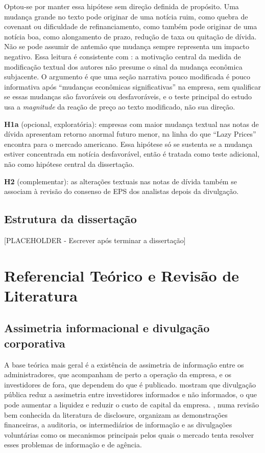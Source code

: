 \documentclass[a4paper,12pt]{report}
\begin{document}
Optou-se por manter essa hipótese sem direção definida de propósito. Uma mudança grande no texto pode originar de uma notícia ruim, como quebra de covenant ou dificuldade de refinanciamento, como também pode originar de uma notícia boa, como alongamento de prazo, redução de taxa ou quitação de dívida. Não se pode assumir de antemão que mudança sempre representa um impacto negativo. Essa leitura é consistente com : a motivação central da medida de modificação textual dos autores não presume o sinal da mudança econômica subjacente. O argumento é que uma seção narrativa pouco modificada é pouco informativa após ``mudanças econômicas significativas'' na empresa, sem qualificar se essas mudanças são favoráveis ou desfavoráveis, e o teste principal do estudo usa a \emph{magnitude} da reação de preço ao texto modificado, não sua direção.

\textbf{H1a} (opcional, exploratória): empresas com maior mudança textual nas notas de dívida apresentam retorno anormal futuro menor, na linha do que ``Lazy Prices'' encontra para o mercado americano. Essa hipótese só se sustenta se a mudança estiver concentrada em notícia desfavorável, então é tratada como teste adicional, não como hipótese central da dissertação.

\textbf{H2} (complementar): as alterações textuais nas notas de dívida também se associam à revisão do consenso de EPS dos analistas depois da divulgação.

\section{Estrutura da dissertação}

[PLACEHOLDER - Escrever após terminar a dissertação]

\chapter{Referencial Teórico e Revisão de Literatura}

\section{Assimetria informacional e divulgação corporativa}

A base teórica mais geral é a existência de assimetria de informação entre os administradores, que acompanham de perto a operação da empresa, e os investidores de fora, que dependem do que é publicado.  mostram que divulgação pública reduz a assimetria entre investidores informados e não informados, o que pode aumentar a liquidez e reduzir o custo de capital da empresa. , numa revisão bem conhecida da literatura de disclosure, organizam as demonstrações financeiras, a auditoria, os intermediários de informação e as divulgações voluntárias como os mecanismos principais pelos quais o mercado tenta resolver esses problemas de informação e de agência.
\end{document}
